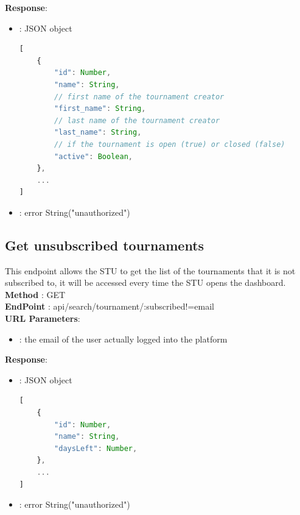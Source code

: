 \textbf{Response}:
    \begin{itemize}
        \item {} : JSON object 
        \begin{lstlisting}[language=JavaScript, label={lst:jscode}, basicstyle=\ttfamily]
[
    {
        "id": Number,
        "name": String,
        // first name of the tournament creator
        "first_name": String,
        // last name of the tournament creator
        "last_name": String,
        // if the tournament is open (true) or closed (false)
        "active": Boolean,
    },
    ...
]
            \end{lstlisting}
        \item {} : error String("unauthorized") 
    \end{itemize}
\subsection*{Get unsubscribed tournaments}
This endpoint allows the STU to get the list of the tournaments that it is not subscribed to, it will be accessed every time the STU opens the dashboard.\\
\textbf{Method} : GET \\
\textbf{EndPoint} : api/search/tournament/:subscribed!=email     \\
\textbf{URL Parameters}:
    \begin{itemize}
        \item {} : the email of the user actually logged into the platform
    \end{itemize}

\textbf{Response}:
    \begin{itemize}
        \item {} : JSON object
        \begin{lstlisting}[language=JavaScript, label={lst:jscode}, basicstyle=\ttfamily]
[
    {
        "id": Number,
        "name": String,
        "daysLeft": Number,
    },
    ...
]
        \end{lstlisting}
        \item {} : error String("unauthorized") 
        \end{itemize}

